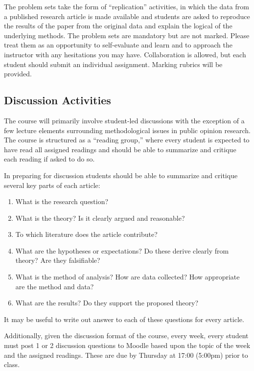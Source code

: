 \documentclass[12pt,a4paper]{article}
\begin{document}
The problem sets take the form of ``replication'' activities, in which the data from a published research article is made available and students are asked to reproduce the results of the paper from the original data and explain the logical of the underlying methods. The problem sets are mandatory but are not marked. Please treat them as an opportunity to self-evaluate and learn and to approach the instructor with any hesitations you may have. Collaboration is allowed, but each student should submit an individual assignment. Marking rubrics will be provided.

\subsection{Discussion Activities}

The course will primarily involve student-led discussions with the exception of a few lecture elements surrounding methodological issues in public opinion research. The course is structured as a ``reading group,'' where every student is expected to have read all assigned readings and should be able to summarize and critique each reading if asked to do so.

In preparing for discussion students should be able to summarize and critique several key parts of each article:

\begin{enumerate}
\item What is the research question?
\item What is the theory? Is it clearly argued and reasonable?
\item To which literature does the article contribute?
\item What are the hypotheses or expectations? Do these derive clearly from theory? Are they falsifiable?
\item What is the method of analysis? How are data collected? How appropriate are the method and data?
\item What are the results? Do they support the proposed theory?
\end{enumerate}

\noindent It may be useful to write out answer to each of these questions for every article.

Additionally, given the discussion format of the course, every week, every student must post 1 or 2 discussion questions to Moodle based upon the topic of the week and the assigned readings. These are due by Thursday at 17:00 (5:00pm) prior to class.
\end{document}
